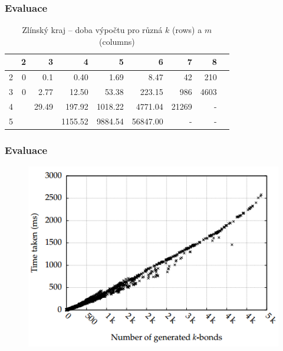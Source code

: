 \documentclass[10pt]{beamer}
\newcommand{\evenrowcolor}{\rowcolor[gray]{0.925}}
\begin{document}
\begin{frame}
	\frametitle{Evaluace}

	\center

\begin{table}[H]
	\caption{Zlínský kraj -- doba výpočtu pro různá $k$ (rows) a $m$ (columns)}
	\centering
	\begin{tabular}{c|rrrrrrrr}

\toprule

	&         2 &         3 &         4 &         5 &         6 &         7 &		8 	\\ \midrule
 2	&      0 &      0.1 &      0.40 &      1.69 &      8.47 &     42 &	210	\\
\evenrowcolor
 3	&      0 &      2.77 &     12.50 &     53.38 &    223.15 &    986 &	4603	\\
 4	&           &     29.49 &    197.92 &   1018.22 &   4771.04 &  21269 &	-		\\
\evenrowcolor
 5	&           &           &   1155.52 &   9884.54 &  56847.00 &	-	   & 	-		\\

	\end{tabular}
\end{table}

\end{frame}

\begin{frame}
	\frametitle{Evaluace}

	\begin{figure}
		\includegraphics[scale=0.6]{images/capture1_2.PNG}
	\end{figure}

\end{frame}
\end{document}
